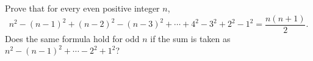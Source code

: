 Prove that for every even positive integer $n$,
\[
n^2-(n-1)^2+(n-2)^2-(n-3)^2+\cdots+4^2-3^2+2^2-1^2=\dfrac{n(n+1)}{2}.
\]
Does the same formula hold for odd $n$ if the sum is taken as $n^2-(n-1)^2+\cdots-2^2+1^2$?
